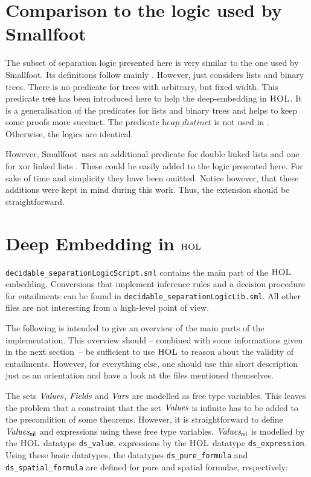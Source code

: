 \documentclass{scrartcl}
\theoremstyle{definition}
\newcommand{\smallfoot}{{\textsf{Smallfoot}}}
\newcommand{\HOL}{{\textsc{HOL}}}
\newcommand{\nil}{{\textsf{nil}}}
\newcommand{\values}{{\emph{Values}}}
\newcommand{\valuesnil}{\ensuremath{\values_\nil}}
\newcommand{\vars}{{\emph{Vars}}}
\newcommand{\fields}{{\emph{Fields}}}
\newcommand{\sftree}{{\textsf{tree}}}
\newcommand{\heapdistinct}{\textit{heap\_distinct}}
\begin{document}
\section{Comparison to the logic used by \smallfoot}

The subset of separation logic presented here is very similar to the one used by
\smallfoot. Its definitions follow mainly \cite{berdine05symbolic}. However,
\cite{berdine05symbolic} just considers lists and binary trees. There is no
predicate for trees with arbitrary, but fixed width. This predicate $\sftree$
has been introduced here to help the deep-embedding in $\HOL$. It is a
generalisation of the predicates for lists and binary trees and helps to keep
some proofs more succinct. The predicate $\heapdistinct$ is not used
in \cite{berdine05symbolic}. Otherwise, the logics are identical.

However, \smallfoot\ uses an additional predicate
for double linked lists and one for xor linked lists \cite{BerdineCO05}. These
could be easily added to the logic presented here. For sake of time and
simplicity they have been omitted. Notice however, that these additions were
kept in mind during this work. Thus, the extension should be
straightforward.



\section{Deep Embedding in $\HOL$}

\texttt{decidable\_separationLogicScript.sml} contains the main part of the
$\HOL$ embedding. Conversions that implement inference rules and a decision
procedure for entailments can be found in
\texttt{decidable\_separationLogicLib.sml}. All other files are not interesting from a high-level point
of view.

The following is intended to give an overview of the main parts of the
implementation. This overview should -- combined with some informations
given in the next section~-- be sufficient to use $\HOL$ to reason about the
validity of entailments. However, for everything else, one should use this
short description just as an orientation and have a look
at the files mentioned themselves.
\medskip

The sets $\values$, $\fields$ and $\vars$ are modelled as free type variables.
This leaves the problem that a constraint that the set $\values$ is infinite
has to be added to the precondition of some theorems. However, it is
straightforward to define $\valuesnil$ and expressions using these free type
variables. $\valuesnil$ is modelled by the $\HOL$ datatype
\texttt{ds\_value}, expressions by the $\HOL$ datatype
\texttt{ds\_expression}. Using these basic datatypes, the datatypes \texttt{ds\_pure\_formula} and
\texttt{ds\_spatial\_formula} are defined for pure and spatial formulae,
respectively:
\end{document}
